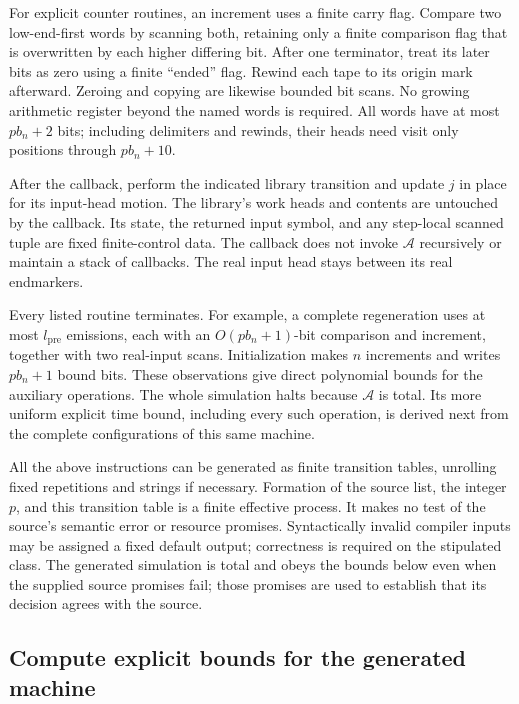 \documentclass[11pt]{article}
\numberwithin{equation}{section}
\theoremstyle{definition}
\theoremstyle{remark}
\begin{document}
For explicit counter routines, an increment uses a finite carry flag.
Compare two low-end-first words by scanning both, retaining only a
finite comparison flag that is overwritten by each higher differing
bit.  After one terminator, treat its later bits as zero using a finite
``ended'' flag.  Rewind each tape to its origin mark afterward.  Zeroing
and copying are likewise bounded bit scans.  No growing arithmetic
register beyond the named words is required.  All words have at most
${p}{b}_n+2$ bits; including delimiters and rewinds, their heads need visit
only positions through ${p}{b}_n+10$.

After the callback, perform the indicated library transition and update
${j}$ in place for its input-head motion.  The library's work heads and
contents are untouched by the callback.  Its state, the returned input
symbol, and any step-local scanned tuple are fixed finite-control data.
The callback does not invoke ${\mathcal{A}}$ recursively or maintain a stack of
callbacks.  The real input head stays between its real endmarkers.

Every listed routine terminates.  For example, a complete regeneration
uses at most ${l}_{\mathrm{pre}}$ emissions, each with an
$O({p}{b}_n+1)$-bit comparison and increment, together with two real-input
scans.  Initialization makes $n$ increments and writes ${p}{b}_n+1$ bound
bits.  These observations give direct polynomial bounds for the
auxiliary operations.  The whole simulation halts because ${\mathcal{A}}$ is total.
Its more uniform explicit time bound, including every such operation,
is derived next from the complete configurations of this same machine.

All the above instructions can be generated as finite transition tables,
unrolling fixed repetitions and strings if necessary.  Formation of the
source list, the integer ${p}$, and this transition table is a finite
effective process.  It makes no test of the source's semantic error or
resource promises.  Syntactically invalid compiler inputs may be assigned
a fixed default output; correctness is required on the stipulated class.
The generated simulation is total and obeys the bounds below even when
the supplied source promises fail; those promises are used to establish
that its decision agrees with the source.

\subsection{Compute explicit bounds for the generated machine}
\label{subsec:compiler-bounds}
\end{document}
